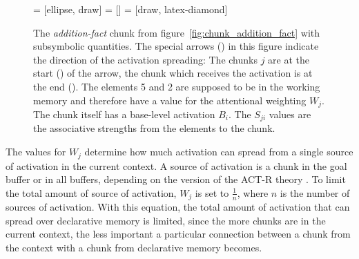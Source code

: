 \begin{figure}[htb]
\centering
{} = [ellipse, draw]
 = [] 
 = [draw, latex-diamond]   

\caption[The \emph{addition-fact} chunk from figure~\ref{fig:chunk_addition_fact} with subsymbolic quantities.]
{The \emph{addition-fact} chunk from figure~\ref{fig:chunk_addition_fact} with subsymbolic quantities. The special arrows () in this figure indicate the direction of the activation spreading: The chunks $j$ are at the start () of the arrow, the chunk which receives the activation is at the end (). The elements 5 and 2 are supposed to be in the working memory and therefore have a value for the attentional weighting $W_j$. The chunk itself has a base-level activation $B_i$. The $S_{ji}$ values are the associative strengths from the elements to the chunk. \cite[fig.~5]{anderson_integrated_2004}}
\label{fig:chunk_activation}
\end{figure}

The values for $W_j$ determine how much activation can spread from a single source of activation in the current context. A source of activation is a chunk in the goal buffer or in all buffers, %
depending on the version of the ACT-R theory \cites[1042]{anderson_integrated_2004}[33]{taatgen_modeling_2006}[unit 5, p. 1]{actr_tutorial}. To limit the total amount of source of activation, $W_j$ is set to $\frac{1}{n}$, where $n$ is the number of sources of activation. With this equation, the total amount of activation that can spread over declarative memory is limited, since the more chunks are in the current context, the less important a particular connection between a chunk from the context with a chunk from declarative memory becomes. 

